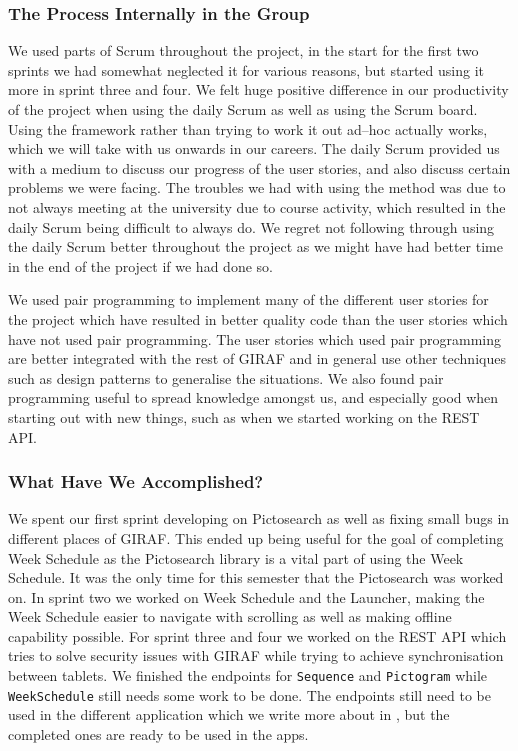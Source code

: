 \subsubsection*{The Process Internally in the Group}
We used parts of Scrum throughout the project, in the start for the first two sprints we had somewhat neglected it for various reasons, but started using it more in sprint three and four. 
We felt huge positive difference in our productivity of the project when using the daily Scrum as well as using the Scrum board.
Using the framework rather than trying to work it out ad--hoc actually works, which we will take with us onwards in our careers.
The daily Scrum provided us with a medium to discuss our progress of the user stories, and also discuss certain problems we were facing.
The troubles we had with using the method was due to not always meeting at the university due to course activity, which resulted in the daily Scrum being difficult to always do.
We regret not following through using the daily Scrum better throughout the project as we might have had better time in the end of the project if we had done so.

We used pair programming to implement many of the different user stories for the project which have resulted in better quality code than the user stories which have not used pair programming.
The user stories which used pair programming are better integrated with the rest of GIRAF and in general use other techniques such as design patterns to generalise the situations.
We also found pair programming useful to spread knowledge amongst us, and especially good when starting out with new things, such as when we started working on the REST API.

\subsubsection*{What Have We Accomplished?}
We spent our first sprint developing on Pictosearch as well as fixing small bugs in different places of GIRAF.
This ended up being useful for the goal of completing Week Schedule as the Pictosearch library is a vital part of using the Week Schedule.
It was the only time for this semester that the Pictosearch was worked on.
In sprint two we worked on Week Schedule and the Launcher, making the Week Schedule easier to navigate with scrolling as well as making offline capability possible.
For sprint three and four we worked on the REST API which tries to solve security issues with GIRAF while trying to achieve synchronisation between tablets.
We finished the endpoints for \texttt{Sequence} and \texttt{Pictogram} while \texttt{WeekSchedule} still needs some work to be done.
The endpoints still need to be used in the different application which we write more about in , but the completed ones are ready to be used in the apps.

